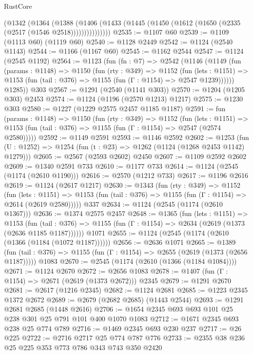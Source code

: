 \begin{lexlean}{RustCore}
\begin{coremodule}
          (@1342
            (@1364
              (@1388
                (@1406 (@1433 (@1445 (@1450 (@1612 (@1650 (@2335 (@2517 (@1546 @2518)))))))))))))))
@2535 := @1107 @60
@2539 := @1109 (@1113 @60) (@1119 @60)
@2540 := @1128 @2449
@2542 := @1124 (@2540 @1143)
@2544 := @1166 (@1167 @60)
@2545 := @1162 @2544
@2547 := @1124 (@2545 @1192)
@2564 := @1123
    (fun (fn : @7) =>
    @2542
      (@1146
        (@1149
          (fun (params : @1148) =>
          @1150
            (fun (rty : @349) =>
            @1152
              (fun (lets : @1151) =>
              @1153 (fun (tail : @376) => @1155 (fun (Γ : @1154) => @2547 @1239))))))
        @1285))
    @303
@2567 := @1291 (@2540 (@1141 @303))
@2570 := @1204 (@1205 @303) @2453
@2574 := @1124 (@1196 (@2570 @1213) @1217)
@2575 := @1230 @303
@2580 := @1227 (@1229 @2575 @2457 @1185 @1187)
@2591 := fun (params : @1148) =>
  @1150
    (fun (rty : @349) =>
    @1152
      (fun (lets : @1151) =>
      @1153 (fun (tail : @376) => @1155 (fun (Γ : @1154) => @2547 (@2574 @2580)))))
@2592 := @1149 @2591
@2593 := @1146 @2592
@2602 := @1253 (fun (U : @1252) => @1254 (fun (t : @23) => @1262 (@1124 (@1268 @2453 @1142) @1279)))
@2605 := @2567 (@2593 @2602) @2450
@2607 := @1109 @2592 @2602
@2609 := @1340 @2591 @733
@2610 := @1177 @733
@2614 := @1124 (@2545 (@1174 (@2610 @1190)))
@2616 := @2570 (@1212 @733)
@2617 := @1196 @2616
@2619 := @1124 (@2617 @1217)
@2630 := @1343
    (fun (rty : @349) =>
    @1152
      (fun (lets : @1151) =>
      @1153 (fun (tail : @376) => @1155 (fun (Γ : @1154) => @2614 (@2619 @2580)))))
    @337
@2634 := @1124 (@2545 (@1174 (@2610 @1367)))
@2636 := @1374 @2575 @2457
@2648 := @1365
    (fun (lets : @1151) =>
    @1153
      (fun (tail : @376) => @1155 (fun (Γ : @1154) => @2634 (@2619 (@1373 (@2636 @1185 @1187))))))
    @1071
@2655 := @1124 (@2545 (@1174 (@2610 (@1366 (@1184 (@1072 @1187))))))
@2656 := @2636 @1071
@2665 := @1389
    (fun (tail : @376) => @1155 (fun (Γ : @1154) => @2655 (@2619 (@1373 (@2656 @1187)))))
    @1083
@2670 := @2545 (@1174 (@2610 (@1366 (@1184 @1084))))
@2671 := @1124 @2670
@2672 := @2656 @1083
@2678 := @1407 (fun (Γ : @1154) => @2671 (@2619 (@1373 @2672))) @2345
@2679 := @1291 @2670
@2681 := @2617 (@1216 @2345)
@2682 := @1124 @2681
@2685 := @1223 @2345 @1372 @2672
@2689 := @2679 (@2682 @2685) (@1443 @2544)
@2693 := @1291 @2681 @2685 (@1448 @2616)
@2706 := @1654 @2345 @693 @693 @101 @25 @238 @301 @25 @791 @101 @400 @1070 @1083
@2712 := @1671 @2345 @693 @238 @25 @774 @789
@2716 := @1469 @2345 @693 @230 @237
@2717 := @26 @225
@2722 := @2716 @2717 @25 @774 @787 @776
@2733 := @2355 @38 @236 @25 @225 @353 @773 @786 @343 @743 @350 @2420

\end{coremodule}
\end{lexlean}
